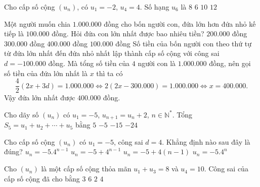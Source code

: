 \begin{ex}%
	Cho cấp số cộng $\left(u_n \right) $, có $u_1=-2$, $u_4=4$. Số hạng $u_6$ là
	\choice
	{$8$}
	{$6$}
	{\True $10$}
	{$12$}
\end{ex}%
\begin{ex}%
	Một người muốn chia $1.000.000$ đồng cho bốn người con, đứa lớn hơn đứa nhỏ kế
	tiếp là $100.000$ đồng. Hỏi đứa con lớn nhất được bao nhiêu tiền?
	\choice
	{$200.000$ đồng}
	{$300.000$ đồng}
	{\True $400.000$ đồng}
	{$100.000$ đồng}
	\loigiai
	{
		Số tiền của bốn người con theo thứ tự từ đứa lớn nhất đến đứa nhỏ nhất lập thành cấp số cộng với công sai $ d=-100.000 $ đồng. Mà tổng số tiền của $ 4 $ người con là $ 1.000.000 $ đồng, nên gọi số tiền của đứa lớn nhất là $ x $ thì ta có
		$$\dfrac{4}{2}(2 x+3 d)=1.000.000 \Leftrightarrow 2(2 x-300.000)=1.000.000 \Leftrightarrow x=400.000.$$
		Vậy đứa lớn nhất được $400.000$ đồng.
	}
\end{ex}%
\begin{ex}%
	Cho dãy số $(u_n)$ có $u_1=-5$, $u_{n+1}=u_n+2$, $n \in \mathbb{N}^*$. Tổng $S_5=u_1+u_2+ \cdots +u_5$ bằng
	\choice
	{$5$}
	{\True $-5$}
	{$-15$}
	{$-24$}
\end{ex}%
\begin{ex}%
Cho cấp số cộng $\left(u_n\right)$ có $u_1=-5$, công sai $d=4$. Khẳng định nào sau đây là đúng?
\choice
{$u_n=-5.4^{n-1}$}
{$u_n=-5+4^{n-1}$}
{\True $u_n=-5+4(n-1)$}
{$u_n=-5.4^{n}$}
\end{ex}%
\begin{ex}%
	Cho $\left(u_{n}\right)$ là một cấp số cộng thỏa mãn $u_{1}+u_{3}=8$ và $u_{4}=10$. Công sai của cấp số cộng đã cho bằng
	\choice
	{\True $3$}
	{$6$}
	{$2$}
	{$4$}
\end{ex}%
